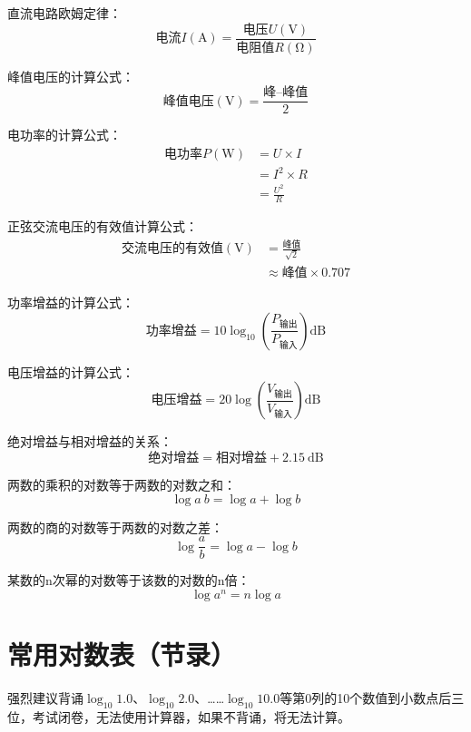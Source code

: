 直流电路欧姆定律：
\[\mbox{电流}I(\si{\ampere})=\frac{\mbox{电压}U(\si{\volt})}{\mbox{电阻值}R(\si{\ohm})}\]

峰值电压的计算公式：
\[\mbox{峰值电压}(\si{\volt})=\frac{\mbox{峰--峰值}}{2}\]

电功率的计算公式：
\begin{equation*}
  \begin{aligned}
    \mbox{电功率}P(\si{\watt}) & = U\times I     \\
                            & = I^2 \times R  \\
                            & = \frac{U^2}{R}
  \end{aligned}
\end{equation*}

正弦交流电压的有效值计算公式：
\begin{equation*}
  \begin{aligned}
    \mbox{交流电压的有效值}(\si{\volt}) & =\frac{\mbox{峰值}}{\sqrt{2}}   \\
                                & \approx \mbox{峰值}\times 0.707
  \end{aligned}
\end{equation*}

功率增益的计算公式：
\[\mbox{功率增益}=10 \log_{10} \left( {\frac{P_{ \mbox{输出} }}{P_{ \mbox{输入} }}}\right) \si{\dB}\]

电压增益的计算公式：
\[\mbox{电压增益}=20 \log \left( {\frac{V_{ \mbox{输出} }}{V_{ \mbox{输入} }}} \right) \si{\dB}\]


绝对增益与相对增益的关系：
\[\mbox{绝对增益} = \mbox{相对增益} + \SI{2.15}{\dB}\]

两数的乘积的对数等于两数的对数之和：
\[\log a\: b=\log a+\log b\]

两数的商的对数等于两数的对数之差：
\[\log\frac{a}{b}=\log a-\log b\]

某数的n次幂的对数等于该数的对数的n倍：
\[\log a^n =n\log a\]

\newpage

\section{常用对数表（节录）}

强烈建议背诵$\log_{10} 1.0$、$\log_{10} 2.0$、……$\log_{10} 10.0$等第0列的10个数值到小数点后三位，考试闭卷，无法使用计算器，如果不背诵，将无法计算。

